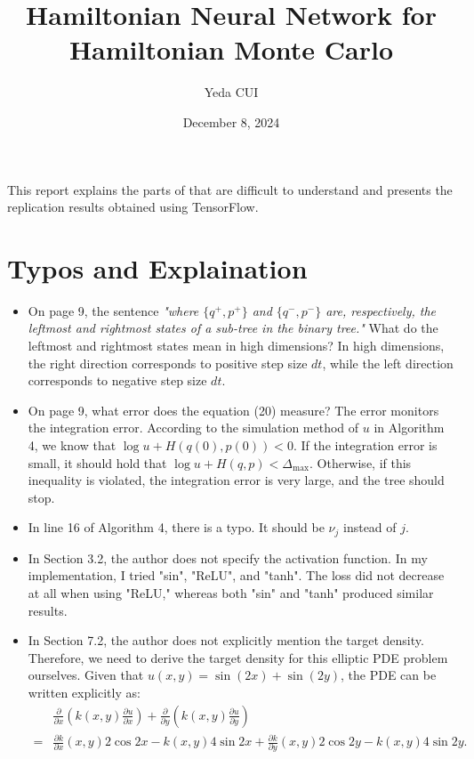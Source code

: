 \documentclass[11pt,a4paper]{article}
\title{Hamiltonian Neural Network for Hamiltonian Monte Carlo}
\author{Yeda CUI}
\date{December 8, 2024}
\theoremstyle{remark}
\begin{document}
\maketitle

This report explains the parts of \cite{dhulipala2023efficient} that are difficult to understand and presents the replication results obtained using TensorFlow.

\section{Typos and Explaination}
\begin{itemize}
	\item On page 9, the sentence \textit{"where $\{q^+, p^+\}$ and $\{q^-, p^-\}$ are, respectively, the leftmost and rightmost states of a sub-tree in the binary tree."} What do the leftmost and rightmost states mean in high dimensions? In high dimensions, the right direction corresponds to positive step size $dt$, while the left direction corresponds to negative step size $dt$.
    \item On page 9, what error does the equation (20) measure? The error monitors the integration error. According to the simulation method of $u$ in Algorithm 4, we know that $\log u + H(q(0), p(0)) < 0$. If the integration error is small, it should hold that $\log u + H(q, p) < \Delta_{\text{max}}$. Otherwise, if this inequality is violated, the integration error is very large, and the tree should stop.
    \item In line 16 of Algorithm 4, there is a typo. It should be $\nu_j$ instead of $j$.
    \item In Section 3.2, the author does not specify the activation function. In my implementation, I tried "sin", "ReLU", and "tanh". The loss did not decrease at all when using "ReLU," whereas both "sin" and "tanh" produced similar results.
    \item In Section 7.2, the author does not explicitly mention the target density. Therefore, we need to derive the target density for this elliptic PDE problem ourselves. Given that $u(x, y) = \sin(2x) + \sin(2y)$, the PDE can be written explicitly as:
\begin{align*}
    & \frac{\partial}{\partial x}\left(k(x, y) \frac{\partial u}{\partial x}\right) + \frac{\partial}{\partial y}\left(k(x, y) \frac{\partial u}{\partial y}\right) \\
    = & \frac{\partial k}{\partial x}(x, y) 2\cos 2x - k(x, y) 4\sin 2x + \frac{\partial k}{\partial y}(x, y) 2\cos 2y - k(x, y) 4\sin 2y.

\end{align*}
\end{itemize}
\end{document}
